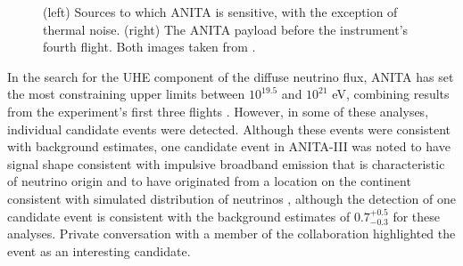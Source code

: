 \begin{figure}
\centering
{}
\caption[ANITA detector schematic]{(left) Sources to which ANITA is sensitive, with the exception of thermal noise. (right) The ANITA payload before the instrument's fourth flight. Both images taken from \cite{Ludwig:2019}.}
\label{fig:ANITA_instrument}
\end{figure}

In the search for the UHE component of the diffuse neutrino flux, ANITA has set the most constraining upper limits between $10^{19.5}$ and $10^{21}$ eV, combining results from the experiment's first three flights \cite{Gorham:2008yk, Gorham:2010kv, Allison:2018cxu}. However, in some of these analyses, individual candidate events were detected. Although these events were consistent with background estimates, one candidate event in ANITA-III was noted to have signal shape consistent with impulsive broadband emission that is characteristic of neutrino origin and to have originated from a location on the continent consistent with simulated distribution of neutrinos \cite{Allison:2018cxu}, although the detection of one candidate event is consistent with the background estimates of $0.7^{+0.5}_{-0.3}$ for these analyses. Private conversation with a member of the collaboration highlighted the event as an interesting candidate. 

